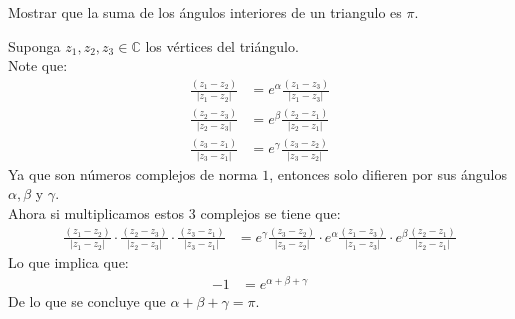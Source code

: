 \begin{homeworkProblem}
  Mostrar que la suma de los ángulos interiores de un triangulo es $\pi$.
  \begin{solution}
    Suponga $z_1,z_2,z_3\in\mathbb{C}$ los vértices del triángulo.\\
    Note que:
    \begin{align*}
      \frac{(z_1-z_2)}{|z_1-z_2|}&=e^{\alpha}\frac{(z_1-z_3)}{|z_1-z_3|}\\
      \frac{(z_2-z_3)}{|z_2-z_3|}&=e^{\beta}\frac{(z_2-z_1)}{|z_2-z_1|}\\
      \frac{(z_3-z_1)}{|z_3-z_1|}&=e^{\gamma}\frac{(z_3-z_2)}{|z_3-z_2|}
    \end{align*}
    Ya que son números complejos de norma $1$, entonces solo difieren por sus ángulos $\alpha, \beta$ y $\gamma$.\\
    Ahora si multiplicamos estos $3$ complejos se tiene que:
    \begin{align*}
      \frac{(z_1-z_2)}{|z_1-z_2|}\cdot\frac{(z_2-z_3)}{|z_2-z_3|}\cdot\frac{(z_3-z_1)}{|z_3-z_1|}&=e^{\gamma}\frac{(z_3-z_2)}{|z_3-z_2|}\cdot e^{\alpha}\frac{(z_1-z_3)}{|z_1-z_3|}\cdot e^{\beta}\frac{(z_2-z_1)}{|z_2-z_1|} 
    \end{align*}
    Lo que implica que:
    \begin{align*}
      -1&=e^{\alpha+\beta+\gamma}
    \end{align*}
    De lo que se concluye que $\alpha+\beta+\gamma=\pi$.
  \end{solution}
\end{homeworkProblem}

